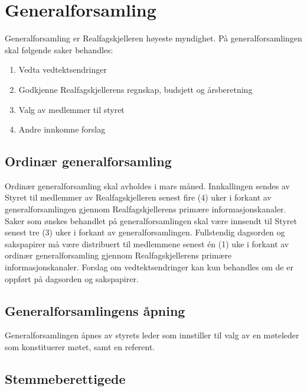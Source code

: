 \section{Generalforsamling} \label{generalforsamling}

Generalforsamling er Realfagskjelleren høyeste myndighet.
På generalforsamlingen skal følgende saker behandles:

\begin{enumerate}
    \item Vedta vedtektsendringer
    \item Godkjenne Realfagskjellerens regnskap, budsjett og årsberetning
    \item Valg av medlemmer til styret
    \item Andre innkomne forslag
\end{enumerate}

\subsection{Ordinær generalforsamling} \label{ordinær generalforsamling}

Ordinær generalforsamling skal avholdes i mars måned.
Innkallingen sendes av Styret til medlemmer av Realfagskjelleren senest fire (4) uker i forkant av generalforsamlingen gjennom Realfagskjellerens primære informasjonskanaler.
Saker som ønskes behandlet på generalforsamlingen skal være innsendt til Styret senest tre (3) uker i forkant av generalforsamlingen.
Fullstendig dagsorden og sakspapirer må være distribuert til medlemmene senest én (1) uke i forkant av ordinær generalforsamling gjennom Realfagskjellerens primære informasjonskanaler.
Forslag om vedtektsendringer kan kun behandles om de er oppført på dagsorden og sakspapirer. %

\subsection{Generalforsamlingens åpning} \label{generalforsamlingens åpning}

Generalforsamlingen åpnes av styrets leder som innstiller til valg av en møteleder som konstituerer møtet, samt en referent.

\subsection{Stemmeberettigede} \label{stemmeberettigede}

